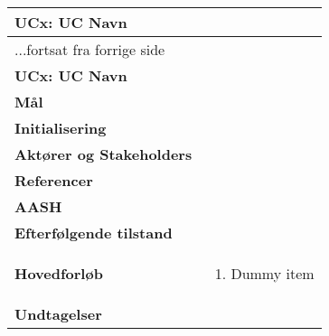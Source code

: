 \begin{center} \centering \label{ucNAVN}		%
	\begin{longtable}{|p{4.6cm}|p{9.4cm}|}  %
	\hline
		\multicolumn{2}{|l|}{\textbf{UCx: UC Navn}} \\\hline		%
		\endfirsthead
		
		\multicolumn{2}{l}{...fortsat fra forrige side} \\ \hline %
		\multicolumn{2}{|l|}{\textbf{UCx: UC Navn}} \\\hline		%
		\endhead	
		
		\textbf{Mål}						&%
		\\\hline
		\textbf{Initialisering}			&%
		\\\hline
		\textbf{Aktører og Stakeholders}	&%
		\\\hline 
		\textbf{Referencer}				&%
		\\\hline
		\textbf{AASH}					&%
		\\\hline
		\textbf{Efterfølgende tilstand}	&%
		\\\hline
		\textbf{Hovedforløb}					
			&\begin{enumerate}
				
				\item Dummy item
			\end{enumerate}\\\hline
		\textbf{Undtagelser}
			&			
			\\\hline
	\end{longtable} 
\end{center}